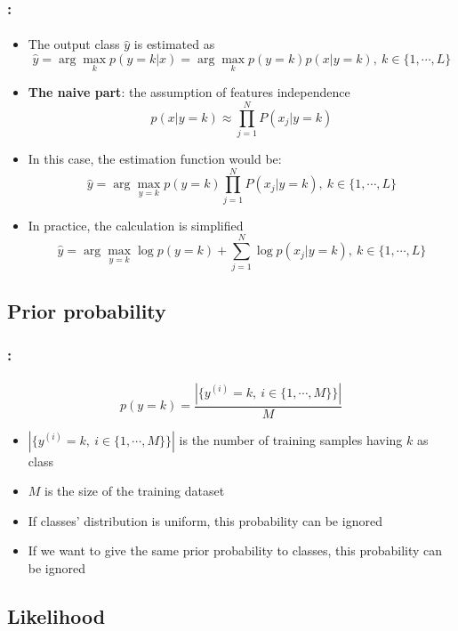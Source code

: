 \documentclass[xcolor=table]{beamer}
\begin{document}
\begin{frame}
	\frametitle{\insertshortsubtitle: \insertsection}
	\framesubtitle{\insertsubsection}
	
	\begin{itemize}
		\item The output class $ \hat{y} $ is estimated as
		\[\hat{y} = \arg\max_{k} p(y=k|x) = \arg\max_{k} p(y=k) p(x|y=k),\ k \in \{1, \cdots, L\} \]
		
		\item \textbf{The naive part}: the assumption of features independence
		\[p(x|y=k) \approx \prod_{j=1}^{N} P(x_j|y=k)\]
		
		\item In this case, the estimation function would be:
		\[\hat{y} = \arg\max_{y=k} p(y=k) \prod_{j=1}^{N} P(x_j|y=k),\ k \in \{1, \cdots, L\}\]
		
		\item In practice, the calculation is simplified 
		\[\hat{y} = \arg\max_{y=k} \log p(y=k) + \sum_{j=1}^{N} \log p(x_j|y=k),\ k \in \{1, \cdots, L\}\]
	\end{itemize}
	
\end{frame}

\subsection{Prior probability}

\begin{frame}
	\frametitle{\insertshortsubtitle: \insertsection}
	\framesubtitle{\insertsubsection}
	
	\[p(y=k) = \frac{|\{y^{(i)} = k,\ i \in \{1, \cdots, M\}\}|}{M}\]
	
	\vfill
	
	\begin{itemize}
		\item $|\{y^{(i)} = k,\ i \in \{1, \cdots, M\}\}|$ is the number of training samples having $k$ as class
		\item $M$ is the size of the training dataset
		\item If classes' distribution is uniform, this probability can be ignored 
		\item If we want to give the same prior probability to classes, this probability can be ignored
	\end{itemize}
	
\end{frame}

\subsection{Likelihood}
\end{document}
